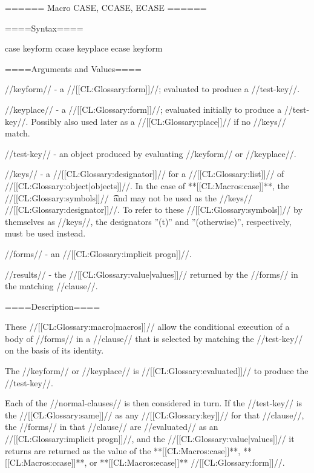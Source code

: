 ====== Macro CASE, CCASE, ECASE ======

====Syntax====

\DefmacWithValues case {keyform  } {} \DefmacWithValues ccase {keyplace } {} \DefmacWithValues ecase {keyform } {}

   

====Arguments and Values====

//keyform// - a //[[CL:Glossary:form]]//; evaluated to produce a //test-key//.

//keyplace// - a //[[CL:Glossary:form]]//; evaluated initially to produce a //test-key//. Possibly also used later as a //[[CL:Glossary:place]]// if no //keys// match.

//test-key// - an object produced by evaluating //keyform// or //keyplace//.

//keys// - a //[[CL:Glossary:designator]]// for a //[[CL:Glossary:list]]// of //[[CL:Glossary:object|objects]]//. In the case of **[[CL:Macros:case]]**, the //[[CL:Glossary:symbols]]// \t\ and  may not be used as the //keys// //[[CL:Glossary:designator]]//. To refer to these //[[CL:Glossary:symbols]]// by themselves as //keys//, the designators ''(t)'' and ''(otherwise)'', respectively, must be used instead.

//forms// - an //[[CL:Glossary:implicit progn]]//.

//results// - the //[[CL:Glossary:value|values]]// returned by the //forms// in the matching //clause//.

====Description====

These //[[CL:Glossary:macro|macros]]// allow the conditional execution of a body of //forms// in a //clause// that is selected by matching the //test-key// on the basis of its identity.

The //keyform// or //keyplace// is //[[CL:Glossary:evaluated]]// to produce the //test-key//.

Each of the //normal-clauses// is then considered in turn. If the //test-key// is the //[[CL:Glossary:same]]// as any //[[CL:Glossary:key]]// for that //clause//, the //forms// in that //clause// are //evaluated// as an //[[CL:Glossary:implicit progn]]//, and the //[[CL:Glossary:value|values]]// it returns are returned as the value of the **[[CL:Macros:case]]**, **[[CL:Macros:ccase]]**, or **[[CL:Macros:ecase]]** //[[CL:Glossary:form]]//.

